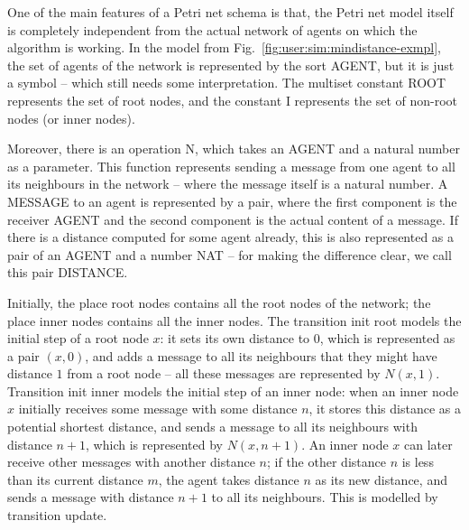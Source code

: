 One of the main features of a Petri net schema is that, the Petri net
model itself is completely independent from the actual network of
agents on which the algorithm is working. In the model from
Fig.~\ref{fig:user:sim:mindistance-exmpl}, the set of agents of
the network is represented by the sort {\sf AGENT}, but it is
just a symbol -- which still needs some interpretation. The
multiset constant {\sf ROOT} represents the set of root nodes,
and the constant {\sf I} represents the set of non-root nodes
(or inner nodes).

Moreover, there is an operation {\sf N}, which takes an {\sf AGENT}
and a natural number as a parameter. This function represents
sending a message from one agent to all its neighbours in the
network -- where the message itself is a natural number. A
{\sf MESSAGE} to an agent is represented by a pair, where the
first component is the receiver {\sf AGENT} and the second component
is the actual content of a message. If there is a distance computed
for some agent already, this is also represented as a pair of
an {\sf AGENT} and a number {\sf NAT} -- for making the difference
clear, we call this pair {\sf DISTANCE}.

Initially, the place {\sf root nodes} contains all the root nodes
of the network; the place {\sf inner nodes} contains all the inner
nodes. The transition {\sf init root} models the initial step of a
root node $x$: it sets its own distance to $0$, which is represented
as a pair $(x,0)$, and adds a message to all its neighbours that
they might have distance $1$ from a root node -- all these messages
are represented by $N(x,1)$. Transition {\sf init inner} models
the initial step of an inner node: when an inner node $x$
initially receives some message with some distance $n$, it stores
this distance as a potential shortest distance, and sends a
message to all its neighbours with distance $n+1$, which is
represented by $N(x,n+1)$. An inner node $x$ can later receive
other messages with another distance $n$; if the other
distance $n$ is less than its current distance $m$, the agent
takes distance $n$ as its new distance, and sends a message with
distance $n+1$ to all its neighbours. This is modelled by transition
{\sf update}.

